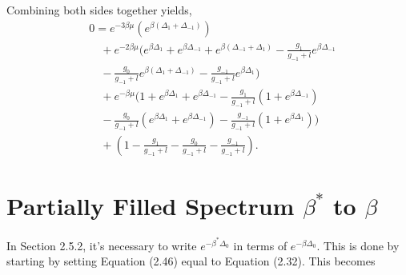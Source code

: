 Combining both sides together yields,
\begin{align}
    &0=e^{-3\beta\mu}(e^{\beta(\Delta_1+\Delta_{-1})})\nonumber\\
    &\quad+e^{-2\beta\mu}(e^{\beta\Delta_1}+e^{\beta\Delta_{-1}}+e^{\beta(\Delta_{-1}+\Delta_1)}-\frac{g_1}{g_{-1}+l}e^{\beta\Delta_{-1}}\nonumber\\
    &\quad-\frac{g_0}{g_{-1}+l}e^{\beta(\Delta_1+\Delta_{-1})}-\frac{g_{-1}}{g_{-1}+l}e^{\beta\Delta_1})\nonumber\\
    &\quad+e^{-\beta\mu}(1+e^{\beta\Delta_1}+e^{\beta\Delta_{-1}}-\frac{g_1}{g_{-1}+l}(1+e^{\beta\Delta_{-1}})\nonumber\\
    &\quad-\frac{g_0}{g_{-1}+l}(e^{\beta\Delta_1}+e^{\beta\Delta_{-1}})-\frac{g_{-1}}{g_{-1}+l}(1+e^{\beta\Delta_1}))\nonumber\\
    &\quad+(1-\frac{g_1}{g_{-1}+l}-\frac{g_0}{g_{-1}+l}-\frac{g_{-1}}{g_{-1}+l}).
\end{align}

\section{Partially Filled Spectrum $\beta^*$ to $\beta$}
In Section 2.5.2, it's necessary to write $e^{-\beta^*\Delta_0}$ in terms of $e^{-\beta\Delta_0}$. This is done by starting by setting Equation (2.46) equal to Equation (2.32). This becomes

